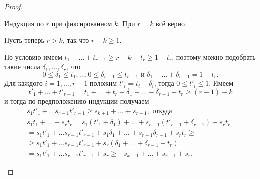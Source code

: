 \begin{proof}
\begin{description}
            Индукция по $r$ при фиксированном $k$. При $r = k$ всё верно.

            Пусть теперь $r > k$, так что $r - k \geq 1$.

            По условию имеем $t_1 + \dots + t_{r-1} \geq r - k - t_r \geq 1 - t_r$, поэтому можно подобрать такие числа $\delta_1, \dots, \delta_r$, что 
            \begin{equation*}
                0 \leq \delta_1 \leq t_1, \dots, 0 \leq \delta_{r-1} \leq t_{r-1}  \text{ и } \delta_1 + \dots + \delta_{r-1} = 1 - t_r.
            \end{equation*}
            Для каждого $i = 1, \dots, r-1$ положим $t'_i = t_i - \delta_i$, тогда $0 \leq t'_i \leq 1$. Имеем
            \begin{equation*}
                t'_1 + \dots + t'_{r-1} = t_1 + \dots + t_r - \delta_1 - \dots - \delta_{r - 1} - t_r \geq (r-1) - k
            \end{equation*}
            и тогда по предположению индукции получаем
            \begin{align*}
                & s_1 t'_1 + \dots s_{r-1} t'_{r-1} \geq s_{k+1} + \dots + s_{r-1}, \text{ откуда} \\
                & s_1 t_1 + \dots + s_r t_r = s_1 (t'_1 + \delta_1) + \dots + s_{r-1} (t'_{r-1} + \delta_{r-1}) + s_r t_r = \\
                & = s_1 t'_1 + \dots s_{r-1} t'_{r-1} + s_1 \delta_1 + \dots + s_{r-1} \delta_{r-1} + s_r t_r \geq \\
                & \geq s_1 t'_1 + \dots s_{r-1} t'_{r-1} + s_r (\delta_1 + \dots + \delta_{r-1} + t_r) = \\
                & = s_1 t'_1 + \dots s_{r-1} t'_{r-1} + s_r \geq + s_{k+1} + \dots + s_{r-1} + s_r.
            \end{align*}
    \end{description}
\end{proof}

